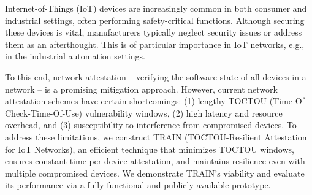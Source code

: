Internet-of-Things (IoT) devices are increasingly common in both consumer and industrial settings, often 
performing safety-critical functions. Although securing these devices is vital, manufacturers typically 
neglect security issues or address them as an afterthought. This is of particular importance
in IoT networks, e.g., in the industrial automation settings.

To this end, network attestation -- verifying the software state of all devices in a network -- is a promising mitigation approach. However, current network attestation schemes have certain shortcomings:
(1) lengthy TOCTOU (Time-Of-Check-Time-Of-Use) vulnerability windows,
(2) high latency and resource overhead, and
(3) susceptibility to interference from compromised devices.
To address these limitations, we construct TRAIN (TOCTOU-Resilient Attestation for IoT Networks), 
an efficient technique that minimizes TOCTOU windows, ensures constant-time per-device attestation, 
and maintains resilience even with multiple compromised devices. We demonstrate TRAIN's viability 
and evaluate its performance via a fully functional and publicly available prototype.
